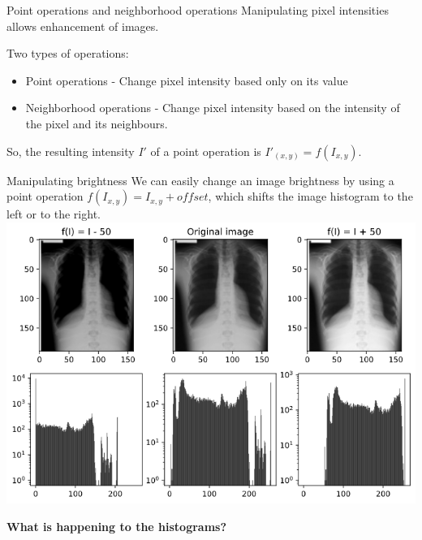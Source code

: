 \documentclass[9pt, aspectratio=169]{beamer}
\begin{document}
\begin{frame}
    {Point operations and neighborhood operations}
    Manipulating pixel intensities allows enhancement of images.

    Two types of operations:
    \begin{itemize}
        \item Point operations - Change pixel intensity based only on its value
        \item Neighborhood operations - Change pixel intensity based on the intensity of the pixel and its neighbours.
    \end{itemize}
    \pause
    So, the resulting intensity $I'$ of a point operation is $I'_{(x, y)} = f(I_{x, y})$.
\end{frame}

\begin{frame}
    {Manipulating brightness}
    We can easily change an image brightness by using a point operation $f(I_{x, y}) = I_{x, y} + offset$, which shifts the image histogram to the left or to the right.
    \centering
    \includegraphics[width=.6\textwidth]{point_operation_change_brightness.png}

    \textbf{What is happening to the histograms?}
\end{frame}
\end{document}
